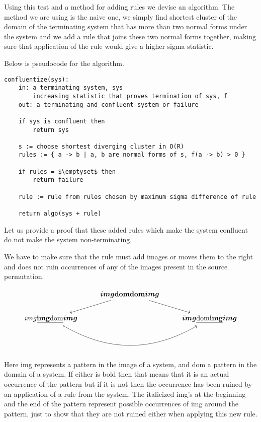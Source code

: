 \documentclass[a4paper, 11pt, english]{article}
\theoremstyle{definition}
\begin{document}
Using this test and a method for adding rules we devise an algorithm. The method we are using is the
naive one, we simply find shortest cluster of the domain of the terminating system that has more than two
normal forms under the system and we add a rule that joins these two normal forms together, making
sure that application of the rule would give a higher sigma statistic.

Below is pseudocode for the algorithm.

\lstset{basicstyle=\footnotesize\ttfamily, frame=single, breaklines=true,
mathescape=true}
\begin{minipage}{\linewidth}
\begin{lstlisting}[title={Algorithm 1}]
confluentize(sys):
    in: a terminating system, sys
        increasing statistic that proves termination of sys, f
    out: a terminating and confluent system or failure

    if sys is confluent then
        return sys

    s := choose shortest diverging cluster in O(R)
    rules := { a -> b | a, b are normal forms of s, f(a -> b) > 0 }

    if rules = $\emptyset$ then
        return failure

    rule := rule from rules chosen by maximum sigma difference of rule

    return algo(sys + rule)
\end{lstlisting}
\end{minipage}

Let us provide a proof that these added rules which make the system confluent do
not make the system non-terminating.
 
We have to make sure that the rule must add images or moves them to the right and does not ruin
occurrences of any of the images present in the source permutation.

\[
\begin{tikzcd}  
    & \bm{img}\mathbf{domdom}\bm{img} \arrow[dl] \arrow[dr] & \\
    img\underline{\mathbf{img}\mathrm{dom}}\bm{img} \arrow[bend
    right=30, mapsto]{rr} & & \bm{img}\underline{\mathrm{dom}\mathbf{img}}\bm{img}
\end{tikzcd}
\]

Here img represents a pattern in the image of a system, and dom a pattern in the domain of a system.
If either is bold then that means that it is an actual occurrence of the pattern but if it is not
then the occurrence has been ruined by an application of a rule from the system. The italicized
img's at the beginning and the end of the pattern represent possible occurrences of img around the
pattern, just to show that they are not ruined either when applying this new rule.
\end{document}
